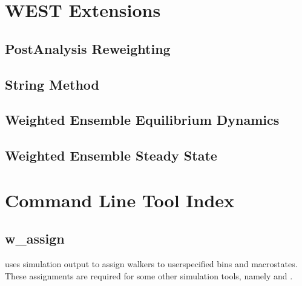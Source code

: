 \documentclass[letterpaper,10pt,english]{sphinxmanual}
\begin{document}
\section{WEST Extensions}
\label{\detokenize{users_guide/westext:west-extensions}}\label{\detokenize{users_guide/westext::doc}}

\subsection{Post\sphinxhyphen{}Analysis Reweighting}
\label{\detokenize{users_guide/westext:post-analysis-reweighting}}

\subsection{String Method}
\label{\detokenize{users_guide/westext:string-method}}

\subsection{Weighted Ensemble Equilibrium Dynamics}
\label{\detokenize{users_guide/westext:weighted-ensemble-equilibrium-dynamics}}

\subsection{Weighted Ensemble Steady State}
\label{\detokenize{users_guide/westext:weighted-ensemble-steady-state}}

\section{Command Line Tool Index}
\label{\detokenize{users_guide/command_line_tools:command-line-tool-index}}\label{\detokenize{users_guide/command_line_tools:id1}}\label{\detokenize{users_guide/command_line_tools::doc}}

\subsection{w\_assign}
\label{\detokenize{users_guide/command_line_tools/w_assign:w-assign}}\label{\detokenize{users_guide/command_line_tools/w_assign:id1}}\label{\detokenize{users_guide/command_line_tools/w_assign::doc}}
 uses simulation output to assign walkers to user\sphinxhyphen{}specified bins
and macrostates. These assignments are required for some other simulation
tools, namely  and .
\end{document}
